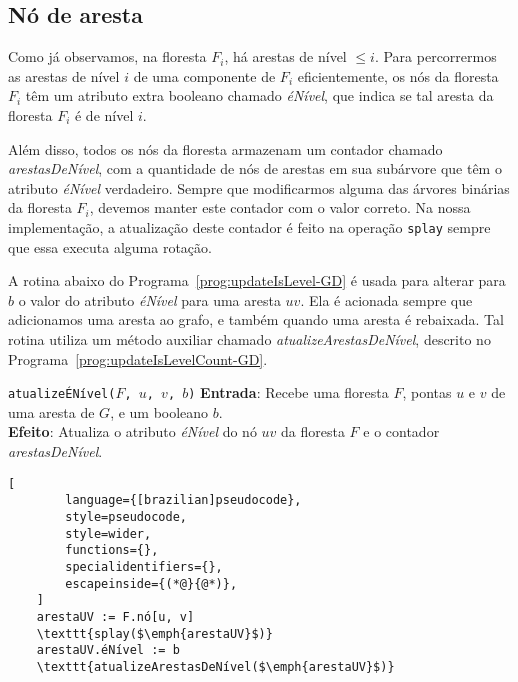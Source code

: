\subsection{Nó de aresta}
\label{sec:node-edge}

Como já observamos, na floresta $F_i$, há arestas de nível $\leq i$. Para percorrermos as arestas de nível $i$ de uma componente de $F_i$ eficientemente, os nós da floresta $F_i$ têm um atributo extra booleano chamado \textit{éNível}, que indica se tal aresta da floresta $F_i$ é de nível $i$. 

Além disso, todos os nós da floresta armazenam um contador chamado \textit{arestasDeNível}, com a quantidade de nós de arestas em sua subárvore que têm o atributo \textit{éNível} verdadeiro. Sempre que modificarmos alguma das árvores binárias da floresta $F_i$, devemos manter este contador com o valor correto. Na nossa implementação, a atualização deste contador é feito na operação \texttt{splay} sempre que essa executa alguma rotação.

A rotina abaixo do Programa~\ref{prog:updateIsLevel-GD} é usada para alterar para $b$ o valor do atributo \textit{éNível} para uma aresta $uv$. Ela é acionada sempre que adicionamos uma aresta ao grafo, e também quando uma aresta é rebaixada. Tal rotina utiliza um método auxiliar chamado \textit{atualizeArestasDeNível}, descrito no Programa~\ref{prog:updateIsLevelCount-GD}.

\begin{programruledcaption}{\texttt{atualizeÉNível($F$, $u$, $v$, $b$)} \label{prog:updateIsLevel-GD}}
    \noindent\textbf{Entrada}: Recebe uma floresta $F$, pontas $u$ e $v$ de uma aresta de $G$, e um booleano $b$.\\
    \noindent\textbf{Efeito}: Atualiza o atributo \textit{éNível} do nó $uv$ da floresta $F$ e o contador \textit{arestasDeNível}.
    \vspace{-0.5\baselineskip}
    \begin{lstlisting}[
        language={[brazilian]pseudocode},
        style=pseudocode,
        style=wider,
        functions={},
        specialidentifiers={},
        escapeinside={(*@}{@*)},
    ]
    arestaUV := F.nó[u, v] 
    \texttt{splay($\emph{arestaUV}$)}
    arestaUV.éNível := b
    \texttt{atualizeArestasDeNível($\emph{arestaUV}$)}
\end{lstlisting}
\vspace{-0.5\baselineskip}
\end{programruledcaption}

